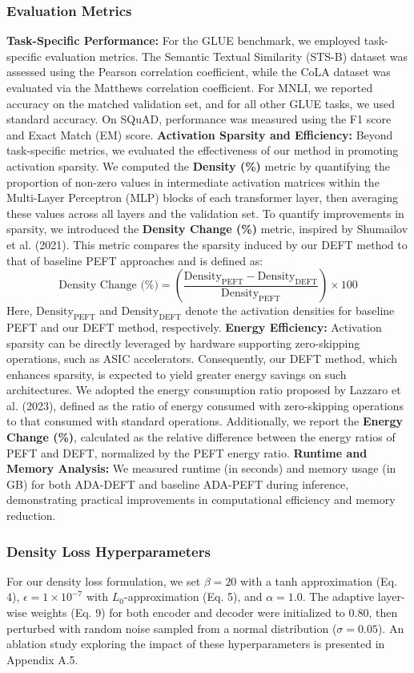\documentclass[conference]{IEEEtran}
\begin{document}
\subsubsection*{Evaluation Metrics}
\textbf{Task-Specific Performance:} For the GLUE benchmark, we employed task-specific evaluation metrics. The Semantic Textual Similarity (STS-B) dataset was assessed using the Pearson correlation coefficient, while the CoLA dataset was evaluated via the Matthews correlation coefficient. For MNLI, we reported accuracy on the matched validation set, and for all other GLUE tasks, we used standard accuracy. On SQuAD, performance was measured using the F1 score and Exact Match (EM) score. \textbf{Activation Sparsity and Efficiency:} Beyond task-specific metrics, we evaluated the effectiveness of our method in promoting activation sparsity. We computed the \textbf{Density (\%)} metric by quantifying the proportion of non-zero values in intermediate activation matrices within the Multi-Layer Perceptron (MLP) blocks of each transformer layer, then averaging these values across all layers and the validation set. To quantify improvements in sparsity, we introduced the \textbf{Density Change (\%)} metric, inspired by Shumailov et al. (2021). This metric compares the sparsity induced by our DEFT method to that of baseline PEFT approaches and is defined as:
\[\text{Density Change (\%)} = \left( \frac{\text{Density}_{\text{PEFT}} - \text{Density}_{\text{DEFT}}}{\text{Density}_{\text{PEFT}}} \right) \times 100\]
Here, \(\text{Density}_{\text{PEFT}}\) and \(\text{Density}_{\text{DEFT}}\) denote the activation densities for baseline PEFT and our DEFT method, respectively. \textbf{Energy Efficiency:} Activation sparsity can be directly leveraged by hardware supporting zero-skipping operations, such as ASIC accelerators. Consequently, our DEFT method, which enhances sparsity, is expected to yield greater energy savings on such architectures. We adopted the energy consumption ratio proposed by Lazzaro et al. (2023), defined as the ratio of energy consumed with zero-skipping operations to that consumed with standard operations. Additionally, we report the \textbf{Energy Change (\%)}, calculated as the relative difference between the energy ratios of PEFT and DEFT, normalized by the PEFT energy ratio. \textbf{Runtime and Memory Analysis:} We measured runtime (in seconds) and memory usage (in GB) for both ADA-DEFT and baseline ADA-PEFT during inference, demonstrating practical improvements in computational efficiency and memory reduction.
\subsubsection*{Density Loss Hyperparameters}
For our density loss formulation, we set \(\beta = 20\) with a tanh approximation (Eq. 4), \(\epsilon = 1 \times 10^{-7}\) with \(L_0\)-approximation (Eq. 5), and \(\alpha = 1.0\). The adaptive layer-wise weights (Eq. 9) for both encoder and decoder were initialized to 0.80, then perturbed with random noise sampled from a normal distribution (\(\sigma = 0.05\)). An ablation study exploring the impact of these hyperparameters is presented in Appendix A.5.
\end{document}

